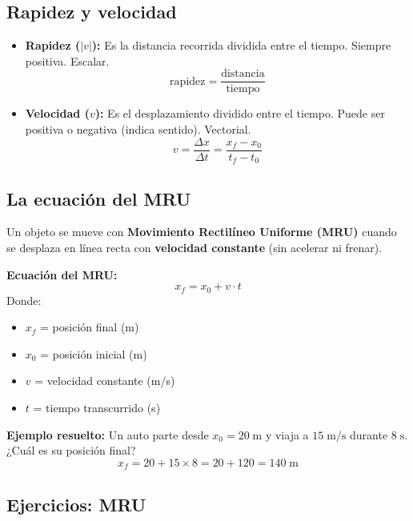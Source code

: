 \documentclass[12pt, a4paper]{article}
\begin{document}
\subsection{Rapidez y velocidad}

\begin{cuadrosolucion}
\begin{itemize}[leftmargin=*]
  \item \textbf{Rapidez ($|v|$):} Es la distancia recorrida dividida entre el tiempo. Siempre positiva. Escalar.
  $$\text{rapidez} = \frac{\text{distancia}}{\text{tiempo}}$$
  
  \item \textbf{Velocidad ($v$):} Es el desplazamiento dividido entre el tiempo. Puede ser positiva o negativa (indica sentido). Vectorial.
  $$v = \frac{\Delta x}{\Delta t} = \frac{x_f - x_0}{t_f - t_0}$$
\end{itemize}
\end{cuadrosolucion}
\newpage

\subsection{La ecuación del MRU}

Un objeto se mueve con \textbf{Movimiento Rectilíneo Uniforme (MRU)} cuando se desplaza en línea recta con \textbf{velocidad constante} (sin acelerar ni frenar).

\begin{cuadroteoria}
\textbf{Ecuación del MRU:}
$$x_f = x_0 + v \cdot t$$
Donde:
\begin{itemize}[leftmargin=*]
  \item $x_f$ = posición final (m)
  \item $x_0$ = posición inicial (m)
  \item $v$ = velocidad constante (m/s)
  \item $t$ = tiempo transcurrido (s)
\end{itemize}
\end{cuadroteoria}

\noindent\textbf{Ejemplo resuelto:} Un auto parte desde $x_0 = 20\;\text{m}$ y viaja a $15\;\text{m/s}$ durante $8\;\text{s}$. ¿Cuál es su posición final?
$$x_f = 20 + 15 \times 8 = 20 + 120 = 140\;\text{m}$$

\newpage

\subsection{Ejercicios: MRU}
\end{document}
